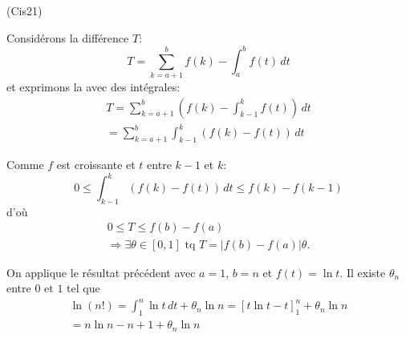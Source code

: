 \begin{tiny}(Cis21)\end{tiny} Considérons la différence $T$:
\begin{displaymath}
 T = \sum_{k=a+1}^bf(k) - \int_a^bf(t)\,dt
\end{displaymath}
et exprimons la avec des intégrales:
\begin{multline*}
 T = \sum_{k=a+1}^b\left( f(k)-\int_{k-1}^kf(t)\right) \,dt\\
= \sum_{k=a+1}^b \int_{k-1}^k \left( f(k) - f(t)\right) \,dt
\end{multline*}

Comme $f$ est croissante et $t$ entre $k-1$ et $k$:
\begin{displaymath}
 0\leq \int_{k-1}^k \left( f(k) - f(t)\right) \,dt
\leq f(k)-f(k-1)
\end{displaymath}
d'où
\begin{multline*}
 0\leq T\leq f(b)-f(a)\\
 \Rightarrow \exists \theta \in \left[0,1 \right] \text{ tq }
 T = \left|f(b) - f(a)\right| \theta. 
\end{multline*}

On applique le résultat précédent avec $a=1$, $b=n$ et $f(t)=\ln t$. Il existe $\theta_n$ entre $0$ et $1$ tel que
\begin{multline*}
 \ln(n!)=\int_1^n\ln t\,dt + \theta_n \ln n
=\left[t\ln t-t \right]_1^n + \theta_n \ln n \\
= n\ln n -n +1 + \theta_n \ln n
\end{multline*}
